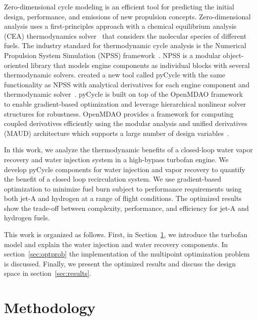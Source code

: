 \documentclass[conf]{new-aiaa}
\begin{document}
Zero-dimensional cycle modeling is an efficient tool for predicting the initial design, performance, and emissions of new propulsion concepts.
Zero-dimensional analysis uses a first-principles approach with a chemical equilibrium analysis (CEA) thermodynamics solver~\cite{Gordon1994} that considers the molecular species of different fuels.
The industry standard for thermodynamic cycle analysis is the Numerical Propulsion System Simulation (NPSS) framework~\cite{JonesNPSS}.
NPSS is a modular object-oriented library that models engine components as individual blocks with several thermodynamic solvers.
\citet{Hendricks2019} created a new tool called pyCycle with the same functionality as NPSS with analytical derivatives for each engine component and thermodynamic solver~\cite{Gray2017b}.
pyCycle is built on top of the OpenMDAO framework~\cite{Gray2019a} to enable gradient-based optimization and leverage hierarchical nonlinear solver structures for robustness.
OpenMDAO provides a framework for computing coupled derivatives efficiently using the modular analysis and unified derivatives (MAUD) architecture which supports a large number of design variables~\cite{Hwang2018a}.

In this work, we analyze the thermodynamic benefits of a closed-loop water vapor recovery and water injection system in a high-bypass turbofan engine.
We develop pyCycle components for water injection and vapor recovery to quantify the benefit of a closed loop recirculation system.
We use gradient-based optimization to minimize fuel burn subject to performance requirements using both jet-A and hydrogen at a range of flight conditions.
The optimized results show the trade-off between complexity, performance, and efficiency for jet-A and hydrogen fuels.

This work is organized as follows. First, in Section~\ref{sec:method}, we introduce the turbofan model and explain the water injection and water recovery components.
In section~\ref{sec:optprob} the implementation of the multipoint optimization problem is discussed.
Finally, we present the optimized results and discuss the design space in section~\ref{sec:results}.

\section{Methodology}
\label{sec:method}
\end{document}
